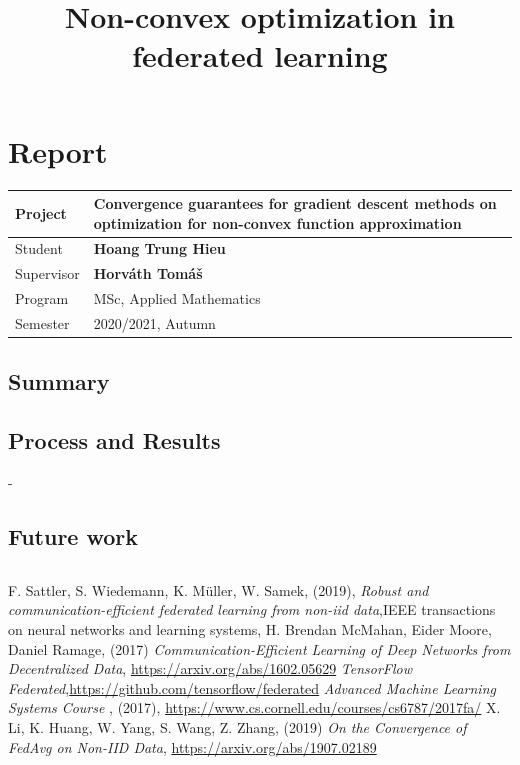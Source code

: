 \documentclass{article}
\theoremstyle{theorem}
\theoremstyle{definition}
\begin{document}
	\section*{Report}
	
		\begin{tabular}{ | m{7em} | m{6.5cm}|  }  
			\hline
			Project & \textbf{Convergence guarantees for gradient descent methods on optimization for non-convex function approximation} \\
			\hline
			Student & \textbf{Hoang Trung Hieu}\\
			\hline 
			Supervisor & \textbf{Horváth Tomáš} \\
			\hline
			 Program & MSc, Applied Mathematics \\
			\hline			
			Semester & 2020/2021, Autumn \\
			\hline
		\end{tabular}
	\subsection*{Summary}
	\subsection*{Process and Results}
	- 
	\subsection*{Future work}
	\subsection*{}
	\begin{thebibliography}{5}
		
		
		F. Sattler, S. Wiedemann, K. Müller, W. Samek,  (2019), \textit{Robust and communication-efficient federated learning from non-iid data},IEEE transactions on neural networks and learning systems,
		H. Brendan McMahan, Eider Moore, Daniel Ramage, (2017)  \textit{Communication-Efficient Learning of Deep Networks
			from Decentralized Data}, \href{https://arxiv.org/abs/1602.05629}{https://arxiv.org/abs/1602.05629}  
		\textit{TensorFlow Federated},\href{ https://github.com/tensorflow/federated }{https://github.com/tensorflow/federated}
	\textit{Advanced Machine Learning Systems Course} , (2017),  \href{https://www.cs.cornell.edu/courses/cs6787/2017fa/}{https://www.cs.cornell.edu/courses/cs6787/2017fa/}	
		X. Li, K. Huang, W. Yang, S. Wang, Z. Zhang, (2019)  \textit{On the Convergence of FedAvg on Non-IID Data}, \href{https://arxiv.org/abs/1907.02189}{https://arxiv.org/abs/1907.02189}
		
	\end{thebibliography}
	\newpage
	\title{Non-convex optimization in federated learning}
	
\end{document}
